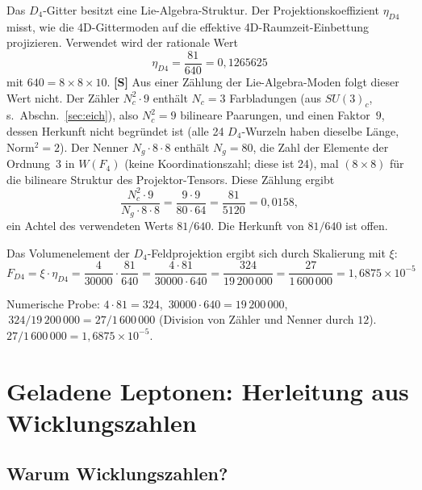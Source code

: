 Das $D_4$-Gitter besitzt eine Lie-Algebra-Struktur. Der
Projektionskoeffizient $\eta_{D4}$ misst, wie die 4D-Gittermoden
auf die effektive 4D-Raumzeit-Einbettung projizieren. Verwendet wird
der rationale Wert
\begin{equation}
  \eta_{D4} = \frac{81}{640} = 0{,}1265625
  \label{eq:eta_d4}
\end{equation}
mit $640 = 8 \times 8 \times 10$. \textbf{[S]} Aus einer Zählung der
Lie-Algebra-Moden folgt dieser Wert nicht. Der Zähler $N_c^2 \cdot 9$
enthält $N_c = 3$ Farbladungen (aus $SU(3)_c$, s.\ Abschn.~\ref{sec:eich}),
also $N_c^2 = 9$ bilineare Paarungen, und einen Faktor~$9$, dessen
Herkunft nicht begründet ist (alle 24 $D_4$-Wurzeln haben dieselbe Länge,
Norm$^2 = 2$). Der Nenner $N_g \cdot 8 \cdot 8$ enthält $N_g = 80$, die
Zahl der Elemente der Ordnung~3 in $W(F_4)$ (keine Koordinationszahl;
diese ist 24), mal $(8 \times 8)$ für die bilineare Struktur des
Projektor-Tensors. Diese Zählung ergibt
\begin{equation}
  \frac{N_c^2 \cdot 9}{N_g \cdot 8 \cdot 8}
            = \frac{9 \cdot 9}{80 \cdot 64}
            = \frac{81}{5120} = 0{,}0158,
  \label{eq:eta_d4_roh}
\end{equation}
ein Achtel des verwendeten Werts $81/640$. Die Herkunft von $81/640$
ist offen.

Das Volumenelement der $D_4$-Feldprojektion ergibt sich durch Skalierung
mit $\xi$:
\begin{equation}
  F_{D4} = \xi \cdot \eta_{D4}
          = \frac{4}{30000} \cdot \frac{81}{640}
          = \frac{4 \cdot 81}{30000 \cdot 640}
          = \frac{324}{19\,200\,000}
          = \frac{27}{1\,600\,000}
          = 1{,}6875 \times 10^{-5}
  \label{eq:f_d4}
\end{equation}

Numerische Probe: $4 \cdot 81 = 324$, $\, 30000 \cdot 640 = 19\,200\,000$,
$\, 324/19\,200\,000 = 27/1\,600\,000$ (Division von Zähler und Nenner
durch $12$). $27/1\,600\,000 = 1{,}6875 \times 10^{-5}$. \checkmark

\section{Geladene Leptonen: Herleitung aus Wicklungszahlen}

\subsection{Warum Wicklungszahlen?}

